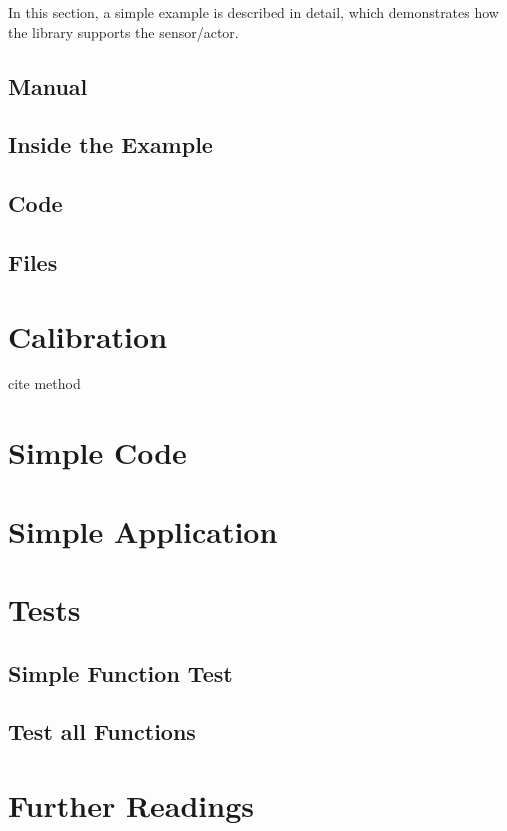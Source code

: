 In this section, a simple example is described in detail, which demonstrates how the library supports the sensor/actor.


\subsection{Manual}

\subsection{Inside the Example}

\subsection{Code}

\subsection{Files}



\section{Calibration}

cite method

\section{Simple Code}


\section{Simple Application}



\section{Tests}

\subsection{Simple Function Test}

\subsection{Test all Functions}



\section{Further Readings}






